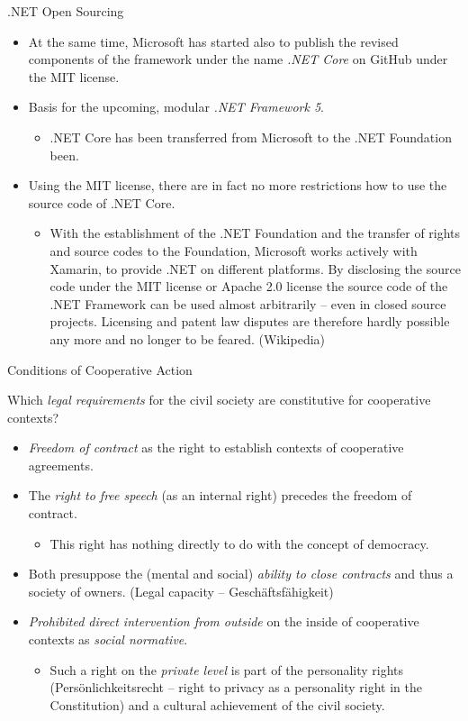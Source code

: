 \documentclass{beamer}
\begin{document}
\begin{frame}{.NET Open Sourcing}
\begin{itemize}
\item At the same time, Microsoft has started also to publish the revised
  components of the framework under the name \emph{.NET Core} on GitHub under
  the MIT license.
\item Basis for the upcoming, modular \emph{.NET Framework 5}.
  \begin{itemize}
  \item .NET Core has been transferred from Microsoft to the .NET Foundation
    been.
  \end{itemize}
\item Using the MIT license, there are in fact no more restrictions how to use
  the source code of .NET Core.
  \begin{itemize}
  \item With the establishment of the .NET Foundation and the transfer of
    rights and source codes to the Foundation, Microsoft works actively with
    Xamarin, to provide .NET on different platforms. By disclosing the source
    code under the MIT license or Apache 2.0 license the source code of the
    .NET Framework can be used almost arbitrarily -- even in closed source
    projects. Licensing and patent law disputes are therefore hardly possible
    any more and no longer to be feared. (Wikipedia)
  \end{itemize}
\end{itemize}
\end{frame}

\begin{frame}{Conditions of Cooperative Action}
  
Which \emph{legal requirements} for the civil society are constitutive for
cooperative contexts?
\begin{itemize}
\item \emph{Freedom of contract} as the right to establish contexts of
  cooperative agreements.
\item The \emph{right to free speech} (as an internal right) precedes the
  freedom of contract.
  \begin{itemize}
  \item This right has nothing directly to do with the concept of democracy.
  \end{itemize}
\item Both presuppose the (mental and social) \emph{ability to close
  contracts} and thus a society of owners. (Legal capacity --
  Geschäftsfähigkeit) 
\item \emph{Prohibited direct intervention from outside} on the inside of
  cooperative contexts as \emph{social normative}.
  \begin{itemize}
  \item Such a right on the \emph{private level} is part of the personality
    rights (Persönlichkeitsrecht -- right to privacy as a personality right in
    the Constitution) and a cultural achievement of the civil society.
  \end{itemize}
\end{itemize}
\end{frame}
\end{document}
